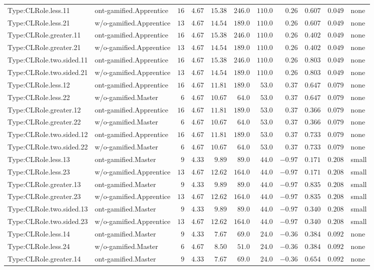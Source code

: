 \documentclass[6pt,a4paper]{article}
\begin{document}
{\begin{longtable}{llrrrrrrrrl}
Type:CLRole.less.11&ont-gamified.Apprentice&$16$&$4.67$&$15.38$&$246.0$&$110.0$&$ 0.26$&$0.607$&$0.049$&none\tabularnewline
Type:CLRole.less.21&w/o-gamified.Apprentice&$13$&$4.67$&$14.54$&$189.0$&$110.0$&$ 0.26$&$0.607$&$0.049$&none\tabularnewline
Type:CLRole.greater.11&ont-gamified.Apprentice&$16$&$4.67$&$15.38$&$246.0$&$110.0$&$ 0.26$&$0.402$&$0.049$&none\tabularnewline
Type:CLRole.greater.21&w/o-gamified.Apprentice&$13$&$4.67$&$14.54$&$189.0$&$110.0$&$ 0.26$&$0.402$&$0.049$&none\tabularnewline
Type:CLRole.two.sided.11&ont-gamified.Apprentice&$16$&$4.67$&$15.38$&$246.0$&$110.0$&$ 0.26$&$0.803$&$0.049$&none\tabularnewline
Type:CLRole.two.sided.21&w/o-gamified.Apprentice&$13$&$4.67$&$14.54$&$189.0$&$110.0$&$ 0.26$&$0.803$&$0.049$&none\tabularnewline
Type:CLRole.less.12&ont-gamified.Apprentice&$16$&$4.67$&$11.81$&$189.0$&$ 53.0$&$ 0.37$&$0.647$&$0.079$&none\tabularnewline
Type:CLRole.less.22&w/o-gamified.Master&$ 6$&$4.67$&$10.67$&$ 64.0$&$ 53.0$&$ 0.37$&$0.647$&$0.079$&none\tabularnewline
Type:CLRole.greater.12&ont-gamified.Apprentice&$16$&$4.67$&$11.81$&$189.0$&$ 53.0$&$ 0.37$&$0.366$&$0.079$&none\tabularnewline
Type:CLRole.greater.22&w/o-gamified.Master&$ 6$&$4.67$&$10.67$&$ 64.0$&$ 53.0$&$ 0.37$&$0.366$&$0.079$&none\tabularnewline
Type:CLRole.two.sided.12&ont-gamified.Apprentice&$16$&$4.67$&$11.81$&$189.0$&$ 53.0$&$ 0.37$&$0.733$&$0.079$&none\tabularnewline
Type:CLRole.two.sided.22&w/o-gamified.Master&$ 6$&$4.67$&$10.67$&$ 64.0$&$ 53.0$&$ 0.37$&$0.733$&$0.079$&none\tabularnewline
Type:CLRole.less.13&ont-gamified.Master&$ 9$&$4.33$&$ 9.89$&$ 89.0$&$ 44.0$&$-0.97$&$0.171$&$0.208$&small\tabularnewline
Type:CLRole.less.23&w/o-gamified.Apprentice&$13$&$4.67$&$12.62$&$164.0$&$ 44.0$&$-0.97$&$0.171$&$0.208$&small\tabularnewline
Type:CLRole.greater.13&ont-gamified.Master&$ 9$&$4.33$&$ 9.89$&$ 89.0$&$ 44.0$&$-0.97$&$0.835$&$0.208$&small\tabularnewline
Type:CLRole.greater.23&w/o-gamified.Apprentice&$13$&$4.67$&$12.62$&$164.0$&$ 44.0$&$-0.97$&$0.835$&$0.208$&small\tabularnewline
Type:CLRole.two.sided.13&ont-gamified.Master&$ 9$&$4.33$&$ 9.89$&$ 89.0$&$ 44.0$&$-0.97$&$0.340$&$0.208$&small\tabularnewline
Type:CLRole.two.sided.23&w/o-gamified.Apprentice&$13$&$4.67$&$12.62$&$164.0$&$ 44.0$&$-0.97$&$0.340$&$0.208$&small\tabularnewline
Type:CLRole.less.14&ont-gamified.Master&$ 9$&$4.33$&$ 7.67$&$ 69.0$&$ 24.0$&$-0.36$&$0.384$&$0.092$&none\tabularnewline
Type:CLRole.less.24&w/o-gamified.Master&$ 6$&$4.67$&$ 8.50$&$ 51.0$&$ 24.0$&$-0.36$&$0.384$&$0.092$&none\tabularnewline
Type:CLRole.greater.14&ont-gamified.Master&$ 9$&$4.33$&$ 7.67$&$ 69.0$&$ 24.0$&$-0.36$&$0.654$&$0.092$&none\tabularnewline

\end{longtable}}
\end{document}
